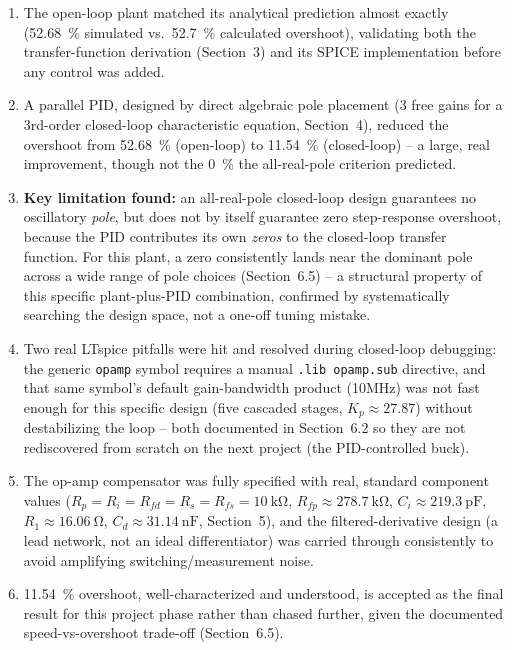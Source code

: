 \documentclass[11pt,letterpaper]{article}
\begin{document}
\begin{enumerate}
    \item The open-loop plant matched its analytical prediction almost exactly (\SI{52.68}{\percent}
    simulated vs.\ \SI{52.7}{\percent} calculated overshoot), validating both the transfer-function
    derivation (Section~3) and its SPICE implementation before any control was added.
    \item A parallel PID, designed by direct algebraic pole placement (3 free gains for a 3rd-order
    closed-loop characteristic equation, Section~4), reduced the overshoot from \SI{52.68}{\percent}
    (open-loop) to \SI{11.54}{\percent} (closed-loop) -- a large, real improvement, though not the
    \SI{0}{\percent} the all-real-pole criterion predicted.
    \item \textbf{Key limitation found:} an all-real-pole closed-loop design guarantees no oscillatory
    \emph{pole}, but does not by itself guarantee zero step-response overshoot, because the PID
    contributes its own \emph{zeros} to the closed-loop transfer function. For this plant, a zero
    consistently lands near the dominant pole across a wide range of pole choices (Section~6.5) -- a
    structural property of this specific plant-plus-PID combination, confirmed by systematically
    searching the design space, not a one-off tuning mistake.
    \item Two real LTspice pitfalls were hit and resolved during closed-loop debugging: the generic
    \texttt{opamp} symbol requires a manual \texttt{.lib opamp.sub} directive, and that same symbol's
    default gain-bandwidth product (10MHz) was not fast enough for this specific design (five cascaded
    stages, $K_p\approx27.87$) without destabilizing the loop -- both documented in Section~6.2 so they
    are not rediscovered from scratch on the next project (the PID-controlled buck).
    \item The op-amp compensator was fully specified with real, standard component values
    ($R_p=R_i=R_{fd}=R_s=R_{fs}=\SI{10}{\kilo\ohm}$, $R_{fp}\approx\SI{278.7}{\kilo\ohm}$,
    $C_i\approx\SI{219.3}{\pico\farad}$, $R_1\approx\SI{16.06}{\ohm}$, $C_d\approx\SI{31.14}{\nano\farad}$,
    Section~5), and the filtered-derivative design (a lead network, not an ideal differentiator) was
    carried through consistently to avoid amplifying switching/measurement noise.
    \item \SI{11.54}{\percent} overshoot, well-characterized and understood, is accepted as the final
    result for this project phase rather than chased further, given the documented speed-vs-overshoot
    trade-off (Section~6.5).
\end{enumerate}

\end{document}
